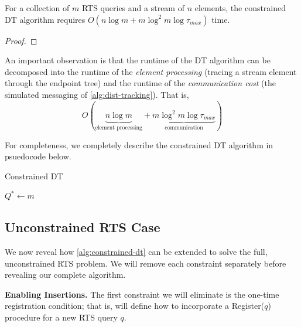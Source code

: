 \begin{theorem} For a collection of $m$ RTS queries and a stream of $n$ elements, the constrained DT algorithm requires $O(n\log m + m\log^2m\log\tau_{max})$ time.
\end{theorem}
\begin{proof}
\end{proof}

An important observation is that the runtime of the DT algorithm can be decomposed into the runtime of the \textit{element processing} (tracing a stream element through the endpoint tree) and the runtime of the \textit{communication cost} (the simulated messaging of \cref{alg:dist-tracking}). That is, 
$$O(\underbrace{n\log m}_{\text{element processing}} + \underbrace{m\log ^2 m\log\tau_{max}}_{\text{communication}})$$

For completeness, we completely describe the constrained DT algorithm in psuedocode below. 

\begin{algorithm}
\caption{Constrained DT}\label{alg:constrained-dt}
\begin{algorithmic}[1]
\Require $Q^* \gets m$ 
\State {}
    \State {}
    \State {}
\EndFor
\State {} 
\State {}
\State {}
\State {}
\EndFor
\end{algorithmic}
\end{algorithm}

\subsection{Unconstrained RTS Case}
\label{ssec:unconstrained-DT-algorithm}

We now reveal how \cref{alg:constrained-dt} can be extended to solve the full, unconstrained RTS problem. We will remove each constraint separately before revealing our complete algorithm. 

\textbf{Enabling Insertions.} The first constraint we will eliminate is the one-time registration condition; that is, will define how to incorporate a Register($q$) procedure for a new RTS query $q$. 

